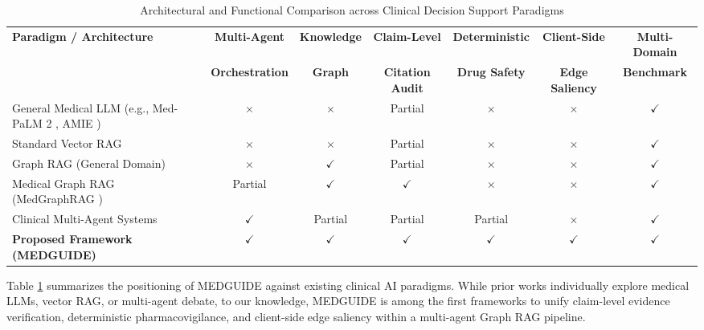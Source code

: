 \documentclass[journal,10pt,twocolumn]{IEEEtran}
\begin{document}
\begin{table}[!t]
\centering
\caption{Architectural and Functional Comparison across Clinical Decision Support Paradigms}
\label{tab:comparative_landscape}
\footnotesize
\setlength{\tabcolsep}{4pt}
\begin{tabularx}{\textwidth}{>{\raggedright\arraybackslash}Xcccccc}
\toprule
\textbf{Paradigm / Architecture} & \textbf{Multi-Agent} & \textbf{Knowledge} & \textbf{Claim-Level} & \textbf{Deterministic} & \textbf{Client-Side} & \textbf{Multi-Domain} \\
& \textbf{Orchestration} & \textbf{Graph} & \textbf{Citation Audit} & \textbf{Drug Safety} & \textbf{Edge Saliency} & \textbf{Benchmark} \\
\midrule
General Medical LLM (e.g., Med-PaLM 2 \cite{singhal2023towards}, AMIE \cite{tu2024towards}) & $\times$ & $\times$ & Partial & $\times$ & $\times$ & $\checkmark$ \\
Standard Vector RAG \cite{lewis2020retrieval} & $\times$ & $\times$ & Partial & $\times$ & $\times$ & $\checkmark$ \\
Graph RAG (General Domain) \cite{edge2024from} & $\times$ & $\checkmark$ & Partial & $\times$ & $\times$ & $\checkmark$ \\
Medical Graph RAG (MedGraphRAG \cite{wu2025medical}) & Partial & $\checkmark$ & $\checkmark$ & $\times$ & $\times$ & $\checkmark$ \\
Clinical Multi-Agent Systems \cite{chen2025enhancing} & $\checkmark$ & Partial & Partial & Partial & $\times$ & $\checkmark$ \\
\midrule
\textbf{Proposed Framework (MEDGUIDE)} & $\mathbf{\checkmark}$ & $\mathbf{\checkmark}$ & $\mathbf{\checkmark}$ & $\mathbf{\checkmark}$ & $\mathbf{\checkmark}$ & $\mathbf{\checkmark}$ \\
\bottomrule
\end{tabularx}
\end{table}

Table \ref{tab:comparative_landscape} summarizes the positioning of MEDGUIDE against existing clinical AI paradigms. While prior works individually explore medical LLMs, vector RAG, or multi-agent debate, to our knowledge, MEDGUIDE is among the first frameworks to unify claim-level evidence verification, deterministic pharmacovigilance, and client-side edge saliency within a multi-agent Graph RAG pipeline.
\end{document}
